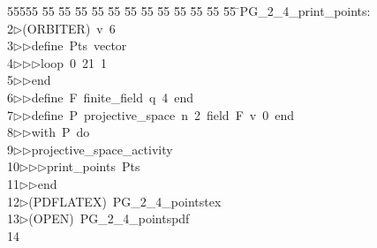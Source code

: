 %
%
\begin{tabbing}
55555 \= 55 \= 55 \= 55 \= 55 \= 55 \= 55 \= 55 \= 55 \= 55 \= 55 \= 55 \= 55 \= \>PG\_2\_4\_print\_points:\\[0pt]
2\>$\triangleright$\>(ORBITER)\ v\ 6\ \\[0pt]
3\>$\triangleright$\>$\triangleright$\>define\ Pts\ vector\ \\[0pt]
4\>$\triangleright$\>$\triangleright$\>$\triangleright$\>loop\ 0\ 21\ 1\ \\[0pt]
5\>$\triangleright$\>$\triangleright$\>end\ \\[0pt]
6\>$\triangleright$\>$\triangleright$\>define\ F\ finite\_field\ q\ 4\ end\ \\[0pt]
7\>$\triangleright$\>$\triangleright$\>define\ P\ projective\_space\ n\ 2\ field\ F\ v\ 0\ end\ \\[0pt]
8\>$\triangleright$\>$\triangleright$\>with\ P\ do\ \\[0pt]
9\>$\triangleright$\>$\triangleright$\>projective\_space\_activity\ \\[0pt]
10\>$\triangleright$\>$\triangleright$\>$\triangleright$\>print\_points\ Pts\ \\[0pt]
11\>$\triangleright$\>$\triangleright$\>end\\[0pt]
12\>$\triangleright$\>(PDFLATEX)\ PG\_2\_4\_pointstex\\[0pt]
13\>$\triangleright$\>(OPEN)\ PG\_2\_4\_pointspdf\\[0pt]
14\>\end{tabbing}
